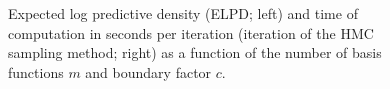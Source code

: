 \begin{figure}
\centering
{} 
\caption{Expected log predictive density (ELPD; left) and time of computation in seconds per iteration (iteration of the HMC sampling method; right) as a function of the number of basis functions $m$ and boundary factor $c$.}
  \label{fig16_elpd_leukemia}
\end{figure}

